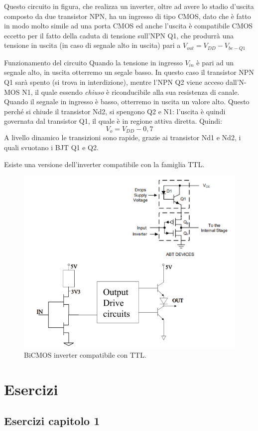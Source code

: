 \documentclass[
]{book}
\begin{document}
Questo circuito in figura, che realizza un inverter, oltre ad avere lo
stadio d'uscita composto da due transistor NPN, ha un ingresso di tipo
CMOS, dato che è fatto in modo molto simile ad una porta CMOS ed anche
l'uscita è compatibile CMOS eccetto per il fatto della caduta di
tensione sull'NPN Q1, che produrrà una tensione in uscita (in caso di
segnale alto in uscita) pari a \(V_{out}=V_{DD}-V_{be-Q1}\)

\begin{redbox}{Funzionamento del circuito}
Quando la tensione in ingresso $V_{in}$ è pari ad un segnale alto, in uscita otterremo un segale basso. In questo caso il transistor NPN Q1 sarà spento (si trova in interdizione), mentre l'NPN Q2 viene acceso dall'N-MOS N1, il quale essendo \emph{chiuso} è riconducibile alla sua resistenza di canale.
\newline
Quando il segnale in ingresso è basso, otterremo in uscita un valore alto. Questo perché si chiude il transistor Nd2, si spengono Q2 e N1: l'uscita è quindi governata dal transistor Q1, il quale è in regione attiva diretta. Quindi:
$$
V_{o}=V_{DD}-0,7
$$
A livello dinamico le transizioni sono rapide, grazie ai transistor Nd1 e Nd2, i quali svuotano i BJT Q1 e Q2.
\end{redbox}

Esiste una versione dell'inverter compatibile con la famiglia TTL.

\begin{figure}
\centering
\includegraphics[width=0.5\linewidth,height=\textheight,keepaspectratio]{assets/imgs/bicmos_ttl_inverter.png}
\caption{BiCMOS inverter compatibile con TTL.}
\end{figure}

\appendix

\chapter{Esercizi}\label{esercizi}

\section{Esercizi capitolo 1}\label{esercizi-capitolo-1}
\end{document}

